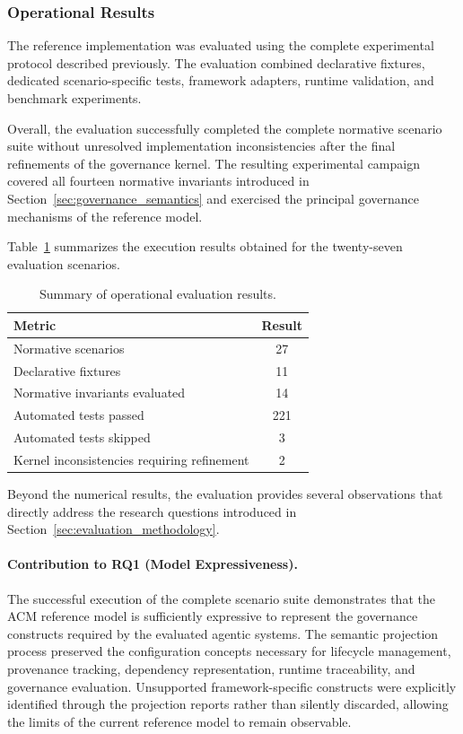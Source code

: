 \documentclass[10pt]{article}
\begin{document}
\subsubsection{Operational Results}
\label{subsubsec:operational_results}

The reference implementation was evaluated using the complete experimental
protocol described previously. The evaluation combined declarative fixtures,
dedicated scenario-specific tests, framework adapters, runtime validation, and
benchmark experiments.

Overall, the evaluation successfully completed the complete normative scenario
suite without unresolved implementation inconsistencies after the final
refinements of the governance kernel. The resulting experimental campaign
covered all fourteen normative invariants introduced in
Section~\ref{sec:governance_semantics} and exercised the principal governance
mechanisms of the reference model.

Table~\ref{tab:scenario_results} summarizes the execution results obtained for
the twenty-seven evaluation scenarios.

\begin{table}[t]
\caption{Summary of operational evaluation results.}
\label{tab:scenario_results}
\centering
\begin{tabular}{lc}
\hline
Metric & Result\\
\hline
Normative scenarios & 27\\
Declarative fixtures & 11\\
Normative invariants evaluated & 14\\
Automated tests passed & 221\\
Automated tests skipped & 3\\
Kernel inconsistencies requiring refinement & 2\\
\hline
\end{tabular}
\end{table}

Beyond the numerical results, the evaluation provides several observations that
directly address the research questions introduced in
Section~\ref{sec:evaluation_methodology}.

\paragraph{Contribution to RQ1 (Model Expressiveness).}

The successful execution of the complete scenario suite demonstrates that the
ACM reference model is sufficiently expressive to represent the governance
constructs required by the evaluated agentic systems. The semantic projection
process preserved the configuration concepts necessary for lifecycle
management, provenance tracking, dependency representation, runtime
traceability, and governance evaluation. Unsupported framework-specific
constructs were explicitly identified through the projection reports rather
than silently discarded, allowing the limits of the current reference model to
remain observable.
\end{document}
